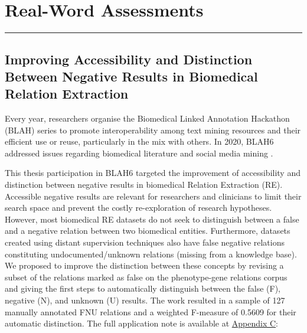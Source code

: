 \hypertarget{7}{}


\chapter[Real-Word Assessments]
{\huge Real-Word Assessments} %

\vspace{-1.6cm}

\begingroup
\color{black}
\par\noindent\rule{\textwidth}{0.4pt}
\endgroup


\section{Improving Accessibility and Distinction Between Negative Results in Biomedical Relation Extraction}

Every year, researchers organise the Biomedical Linked Annotation Hackathon (BLAH) series to promote interoperability among text mining resources and their efficient use or reuse, particularly in the mix with others. In 2020, BLAH6 addressed issues regarding biomedical literature and social media mining \citep{kim2020editor}. 

This thesis participation in BLAH6 targeted the improvement of accessibility and distinction between negative results in biomedical Relation Extraction (RE). Accessible negative results are relevant for researchers and clinicians to limit their search space and prevent the costly re-exploration of research hypotheses. However, most biomedical RE datasets do not seek to distinguish between a false and a negative relation between two biomedical entities. Furthermore, datasets created using distant supervision techniques also have false negative relations constituting undocumented/unknown relations (missing from a knowledge base). We proposed to improve the distinction between these concepts by revising a subset of the relations marked as false on the phenotype-gene relations corpus and giving the first steps to automatically distinguish between the false (F), negative (N), and unknown (U) results. The work resulted in a sample of 127 manually annotated FNU relations and a weighted F-measure of 0.5609 for their automatic distinction. The full application note is available at \hyperlink{AC}{Appendix C}:

